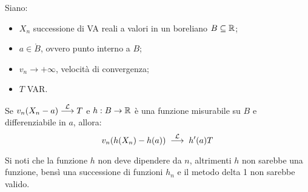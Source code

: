 \begin{teo}
  Siano:
  \begin{itemize}
    \item $X_n$ successione di VA reali a valori in un boreliano $B \subseteq \mathbb R$;
    \item $a \in \mathring{B}$, ovvero punto interno a $B$;
    \item $v_n \to +\infty$, velocità di convergenza;
    \item $T$ VAR.
  \end{itemize}
  Se $v_n(X_n - a) \stackrel{\mathcal L}{\longrightarrow} T$ e $h:B \to \mathbb R$ è una funzione misurabile su $B$ e differenziabile in $a$, allora:
  $$v_n(h(X_n) - h(a)) \; \stackrel{\mathcal L}{\longrightarrow} \; h'(a) T $$
\end{teo}
Si noti che la funzione $h$ non deve dipendere da $n$, altrimenti $h$ non sarebbe una funzione, bensì una successione di funzioni $h_n$ e il metodo delta 1 non sarebbe valido.
